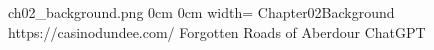 	{ch02_background.png}				%
	{0cm}								%
	{0cm}								%
	{width=\paperwidth}					%
	{Chapter02Background}				%
	{https://casinodundee.com/}			%
	{Forgotten Roads of Aberdour}		%
	{ChatGPT}							%
	




